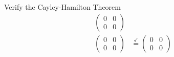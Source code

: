 \begin{example}{Verify the Cayley-Hamilton Theorem}
\begin{align*}
\begin{pmatrix}
                            0 & 0 \\
                            0 & 0
                          \end{pmatrix} \\
    \begin{pmatrix}
      0 & 0 \\
      0 & 0
    \end{pmatrix} &\overset{\checkmark}{=}
                    \begin{pmatrix}
                      0 & 0 \\
                      0 & 0
                    \end{pmatrix}
  \end{align*}
\end{example}

